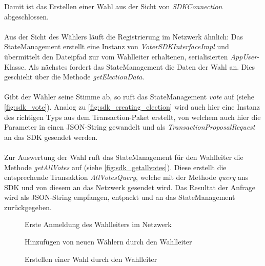 \documentclass[parskip=full]{scrartcl}
\begin{document}
	Damit ist das Erstellen einer Wahl aus der Sicht von \textit{SDKConnection} abgeschlossen. 
	\\ \\
	Aus der Sicht des Wählers läuft die Registrierung im Netzwerk ähnlich: Das StateManagement erstellt eine Instanz von \textit{VoterSDKInterfaceImpl} und übermittelt den Dateipfad zur vom Wahlleiter erhaltenen, serialisierten \textit{AppUser}-Klasse. Als nächstes fordert das StateManagement die Daten der Wahl an. Dies geschieht über die Methode \textit{getElectionData}.
	\\ \\
	Gibt der Wähler seine Stimme ab, so ruft das StateManagement \textit{vote} auf (siehe \autoref{fig:sdk_vote}). Analog zu \autoref{fig:sdk_creating_election} wird auch hier eine Instanz des richtigen Typs aus dem Transaction-Paket erstellt, von welchem auch hier die Parameter in einen JSON-String gewandelt und als \textit{TransactionProposalRequest} an das SDK gesendet werden.
	\\ \\	
	Zur Auswertung der Wahl ruft das StateManagement für den Wahlleiter die Methode \textit{getAllVotes} auf (siehe \autoref{fig:sdk_getallvotes}). Diese erstellt die entsprechende Transaktion \textit{AllVotesQuery},
	welche mit der Methode \textit{query} ans SDK und von diesem an das Netzwerk gesendet wird. Das Resultat der Anfrage wird als JSON-String empfangen, entpackt und an das StateManagement zurückgegeben. 
	\newpage
	\pagestyle{empty}
	\begin{figure}
		\centering
		\hspace{-100pt}
		\centerline{}
		\caption{Erste Anmeldung des Wahlleiters im Netzwerk}
		\label{fig:sdk_first_registration}
	\end{figure}
	\newpage
	\begin{figure}
		\centering
		\hspace{-100pt}
		\centerline{}
		\caption{Hinzufügen von neuen Wählern durch den Wahlleiter}
		\label{fig:sdk_adding_voters}
	\end{figure}
	\newpage
	\begin{figure}
		\centering
		\hspace{-100pt}
		\centerline{}
		\caption{Erstellen einer Wahl durch den Wahlleiter}
		\label{fig:sdk_creating_election}
	\end{figure}
\end{document}

